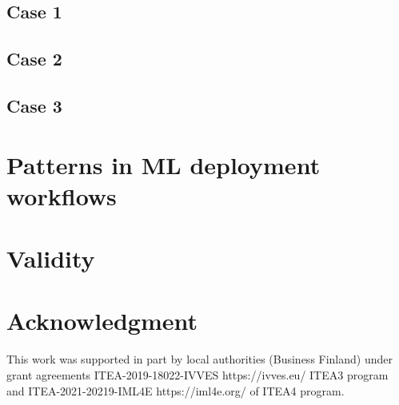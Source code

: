 \documentclass[conference]{IEEEtran}
\begin{document}
\subsection*{Case 1}\label{1}


\subsection*{Case 2}\label{2}


\subsection*{Case 3}\label{3}









\section{Patterns in ML deployment workflows}
\label{sec: patterns}




\section{Validity}
\label{sec: validity}


\section*{Acknowledgment}

This work was supported in part by local authorities (Business Finland) under grant agreements ITEA-2019-18022-IVVES https://ivves.eu/ ITEA3 program and ITEA-2021-20219-IML4E https://iml4e.org/ of ITEA4 program.


\end{document}
